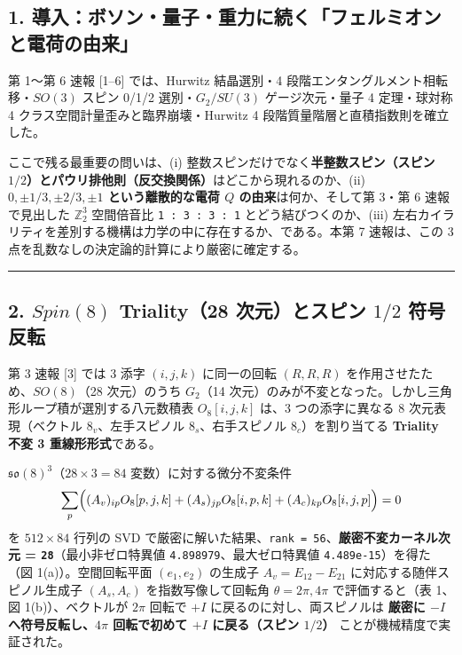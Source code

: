 \documentclass[
  a4paper,
]{ltjsarticle}
\begin{document}
\subsection{1.
導入：ボソン・量子・重力に続く「フェルミオンと電荷の由来」}\label{ux5c0eux5165ux30dcux30bdux30f3ux91cfux5b50ux91cdux529bux306bux7d9aux304fux30d5ux30a7ux30ebux30dfux30aaux30f3ux3068ux96fbux8377ux306eux7531ux6765}

第 1〜第 6 速報 {[}1--6{]} では、Hurwitz 結晶選別・4
段階エンタングルメント相転移・\(SO(3)\) スピン 0/1/2 選別・\(G_2/SU(3)\)
ゲージ次元・量子 4 定理・球対称 4 クラス空間計量歪みと臨界崩壊・Hurwitz
4 段階質量階層と直積指数則を確立した。

ここで残る最重要の問いは、(i)
整数スピンだけでなく\textbf{半整数スピン（スピン
\(1/2\)）とパウリ排他則（反交換関係）}はどこから現れるのか、(ii)
\textbf{\(0, \pm 1/3, \pm 2/3, \pm 1\) という離散的な電荷 \(Q\)
の由来}は何か、そして第 3・第 6 速報で見出した \(\mathbb{Z}_2^3\)
空間倍音比 \texttt{1\ :\ 3\ :\ 3\ :\ 1} とどう結びつくのか、(iii)
左右カイラリティを差別する機構は力学の中に存在するか、である。本第 7
速報は、この 3 点を乱数なしの決定論的計算により厳密に確定する。

\begin{center}\rule{0.5\linewidth}{0.5pt}\end{center}

\subsection{\texorpdfstring{2. \(Spin(8)\) Triality（28 次元）とスピン
\(1/2\)
符号反転}{2. Spin(8) Triality（28 次元）とスピン 1/2 符号反転}}\label{spin8-triality28-ux6b21ux5143ux3068ux30b9ux30d4ux30f3-12-ux7b26ux53f7ux53cdux8ee2}

第 3 速報 {[}3{]} では 3 添字 \((i, j, k)\) に同一の回転 \((R, R, R)\)
を作用させたため、\(SO(8)\)（28 次元）のうち \(G_2\)（14
次元）のみが不変となった。しかし三角形ループ積が選別する八元数積表
\(O_8[i, j, k]\) は、3 つの添字に異なる 8 次元表現（ベクトル
\(8_v\)、左手スピノル \(8_s\)、右手スピノル \(8_c\)）を割り当てる
\textbf{Triality 不変 3 重線形形式}である。

\(\mathfrak{so}(8)^3\)（\(28 \times 3 = 84\) 変数）に対する微分不変条件
\[\sum_p \Bigl((A_v)_{ip} O_8[p, j, k] + (A_s)_{jp} O_8[i, p, k] + (A_c)_{kp} O_8[i, j, p]\Bigr) = 0\]
を \(512 \times 84\) 行列の SVD
で厳密に解いた結果、\texttt{rank\ =\ 56}、\textbf{厳密不変カーネル次元 =
\texttt{28}}（最小非ゼロ特異値 \texttt{4.898979}、最大ゼロ特異値
\texttt{4.489e-15}）を得た（図 1(a)）。空間回転平面 \((e_1, e_2)\)
の生成子 \(A_v = E_{12} - E_{21}\) に対応する随伴スピノル生成子
\((A_s, A_c)\) を指数写像して回転角 \(\theta = 2\pi, 4\pi\)
で評価すると（表 1、図 1(b)）、ベクトルが \(2\pi\) 回転で \(+I\)
に戻るのに対し、両スピノルは \textbf{厳密に \(-I\)
へ符号反転し、\(4\pi\) 回転で初めて \(+I\) に戻る（スピン \(1/2\)）}
ことが機械精度で実証された。
\end{document}
